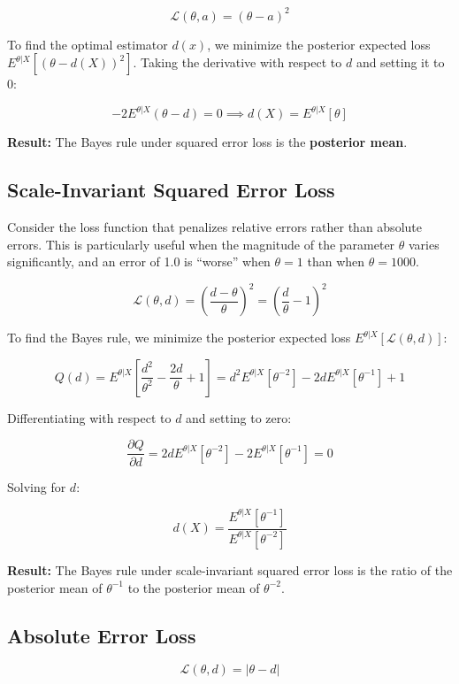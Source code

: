 \documentclass[
  letterpaper,
  DIV=11,
  numbers=noendperiod]{scrreprt}
\renewcommand{\[}{\begin{equation}}
\renewcommand{\]}{\end{equation}}
\theoremstyle{definition}
\theoremstyle{plain}
\theoremstyle{plain}
\theoremstyle{plain}
\theoremstyle{definition}
\theoremstyle{plain}
\theoremstyle{remark}
\begin{document}
\[\mathcal{L}(\theta, a) = (\theta - a)^2\]

To find the optimal estimator \(d(x)\), we minimize the posterior
expected loss \(E^{\theta|X}[(\theta - d(X))^2]\). Taking the derivative
with respect to \(d\) and setting it to 0:

\[-2 E^{\theta|X}(\theta - d) = 0 \implies d(X) = E^{\theta|X}[\theta]\]

\textbf{Result:} The Bayes rule under squared error loss is the
\textbf{posterior mean}.

\subsection{Scale-Invariant Squared Error
Loss}\label{scale-invariant-squared-error-loss}

Consider the loss function that penalizes relative errors rather than
absolute errors. This is particularly useful when the magnitude of the
parameter \(\theta\) varies significantly, and an error of 1.0 is
``worse'' when \(\theta=1\) than when \(\theta=1000\).

\[
\mathcal{L}(\theta, d) = \left( \frac{d - \theta}{\theta} \right)^2 = \left( \frac{d}{\theta} - 1 \right)^2
\]

To find the Bayes rule, we minimize the posterior expected loss
\(E^{\theta|X} [\mathcal{L}(\theta, d)]\):

\[
Q(d) = E^{\theta|X} \left[ \frac{d^2}{\theta^2} - \frac{2d}{\theta} + 1 \right] = d^2 E^{\theta|X}[\theta^{-2}] - 2d E^{\theta|X}[\theta^{-1}] + 1
\]

Differentiating with respect to \(d\) and setting to zero:

\[
\frac{\partial Q}{\partial d} = 2d E^{\theta|X}[\theta^{-2}] - 2 E^{\theta|X}[\theta^{-1}] = 0
\]

Solving for \(d\):

\[
d(X) = \frac{E^{\theta|X}[\theta^{-1}]}{E^{\theta|X}[\theta^{-2}]}
\]

\textbf{Result:} The Bayes rule under scale-invariant squared error loss
is the ratio of the posterior mean of \(\theta^{-1}\) to the posterior
mean of \(\theta^{-2}\).

\subsection{Absolute Error Loss}\label{absolute-error-loss}

\[\mathcal{L}(\theta, d) = |\theta - d|\]
\end{document}
